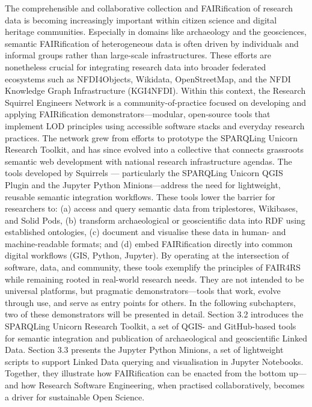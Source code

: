 \documentclass{eceasst}
\begin{document}
The comprehensible and collaborative collection and FAIRification of research data is becoming increasingly important within citizen science and digital heritage communities. Especially in domains like archaeology and the geosciences, semantic FAIRification of heterogeneous data is often driven by individuals and informal groups rather than large-scale infrastructures. These efforts are nonetheless crucial for integrating research data into broader federated ecosystems such as NFDI4Objects, Wikidata, OpenStreetMap, and the NFDI Knowledge Graph Infrastructure (KGI4NFDI). Within this context, the Research Squirrel Engineers Network is a community-of-practice focused on developing and applying FAIRification demonstrators—modular, open-source tools that implement LOD principles using accessible software stacks and everyday research practices. The network grew from efforts to prototype the SPARQLing Unicorn Research Toolkit, and has since evolved into a collective that connects grassroots semantic web development with national research infrastructure agendas. The tools developed by Squirrels — particularly the SPARQLing Unicorn QGIS Plugin and the Jupyter Python Minions—address the need for lightweight, reusable semantic integration workflows. These tools lower the barrier for researchers to: (a) access and query semantic data from triplestores, Wikibases, and Solid Pods, (b) transform archaeological or geoscientific data into RDF using established ontologies, (c) document and visualise these data in human- and machine-readable formats; and (d) embed FAIRification directly into common digital workflows (GIS, Python, Jupyter). By operating at the intersection of software, data, and community, these tools exemplify the principles of FAIR4RS while remaining rooted in real-world research needs. They are not intended to be universal platforms, but pragmatic demonstrators—tools that work, evolve through use, and serve as entry points for others. In the following subchapters, two of these demonstrators will be presented in detail. Section 3.2 introduces the SPARQLing Unicorn Research Toolkit, a set of QGIS- and GitHub-based tools for semantic integration and publication of archaeological and geoscientific Linked Data. Section 3.3 presents the Jupyter Python Minions, a set of lightweight scripts to support Linked Data querying and visualisation in Jupyter Notebooks. Together, they illustrate how FAIRification can be enacted from the bottom up—and how Research Software Engineering, when practised collaboratively, becomes a driver for sustainable Open Science.
\end{document}
